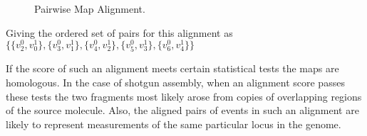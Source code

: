 \documentclass[11pt]{article}
\begin{document}
\begin{figure}[h!]
 \caption{Pairwise Map Alignment.}
\begin{center}

\end{center}
\end{figure}
\begin{center}
Giving the ordered set of pairs for this alignment as $\{\{v^0_2,v^1_0\},\{v^0_3,v^1_1\},\{v^0_4,v^1_2\},\{v^0_5,v^1_3\},\{v^0_6,v^1_4\}\}$
\end{center}

 If the score of such an alignment meets certain statistical tests the maps are homologous.  In the case of shotgun assembly, when an alignment score passes these tests the two fragments most likely arose from copies of overlapping regions of the source molecule.  Also, the aligned pairs of events in such an alignment are likely to represent measurements of the same particular locus in the genome.
\end{document}
